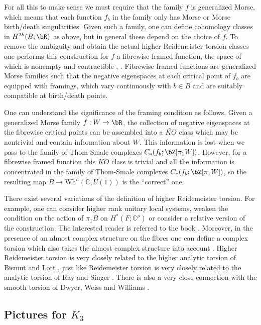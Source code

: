 \documentclass[JEP,XML,SOM,Unicode,NoFloatCountersInSection]{cedram}
\newcommand{\Wh}{\mathrm{Wh}}
\theoremstyle{plain}
\theoremstyle{definition}
\newcommand{\bC}{\mathbb{C}}\newcommand{\bD}{\mathbb{D}}
\begin{document}
For all this to make sense we must require that the family $f$ is generalized Morse, which means that each function $f_b$ in the family only has Morse or Morse birth/death singularities. Given such a family, one can define cohomology classes in $H^{2k}(B;\bR)$ as above, but in general these depend on the choice of $f$. To remove the ambiguity and obtain the actual higher Reidemeister torsion classes one performs this construction for $f$ a fibrewise framed function, the space of which is nonempty and contractible \cite{I87}, \cite{EM12}. Fibrewise framed functions are generalized Morse families such that the negative eigenspaces at each critical point of $f_b$ are equipped with framings, which vary continuously with $b \in B$ and are suitably compatible at birth/death points.

One can understand the significance of the framing condition as follows. Given a generalized Morse family $f:W \to \bR$, the collection of negative eigenspaces at the fibrewise critical points can be assembled into a $\widetilde{KO}$ class which may be nontrivial and contain information about $W$. This information is lost when we pass to the family of Thom-Smale complexes $C_*(f_b;\bZ[\pi_1W])$. However, for a fibrewise framed function this $\widetilde{KO}$ class is trivial and all the information is concentrated in the family of Thom-Smale complexes $C_*(f_b;\bZ[\pi_1W])$, so the resulting map $B \to \Wh^h(\bC,U(1))$ is the ``correct'' one.

There exist several variations of the definition of higher Reidemeister torsion. For example, one can consider higher rank unitary local systems, weaken the condition on the action of $\pi_1B$ on $H^*(F;\bC^\rho)$ or consider a relative version of the construction. The interested reader is referred to the book \cite{I02}. Moreover, in the presence of an almost complex structure on the fibres one can define a complex torsion which also takes the almost complex structure into account \cite{I05}. Higher Reidemeister torsion is very closely related to the higher analytic torsion of Bismut and Lott \cite{BL95}, just like Reidemeister torsion is very closely related to the analytic torsion of Ray and Singer \cite{RS71}. There is also a very close connection with the smooth torsion of Dwyer, Weiss and Williams \cite{DWW03}.

\subsection{Pictures for $K_3$}\label{pictures for K3}
\end{document}
